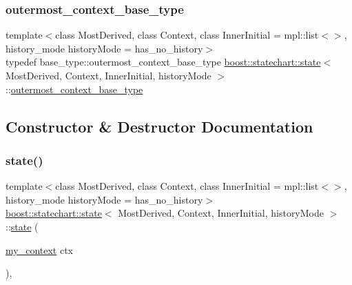 \mbox{\label{classboost_1_1statechart_1_1state_a1ba302317e3eb4b10d0c8424eea5ea67}} 
\subsubsection{\texorpdfstring{outermost\+\_\+context\+\_\+base\+\_\+type}{outermost\_context\_base\_type}}
{\footnotesize\ttfamily template$<$class Most\+Derived, class Context, class Inner\+Initial = mpl\+::list$<$$>$, history\+\_\+mode history\+Mode = has\+\_\+no\+\_\+history$>$ \\
typedef base\+\_\+type\+::outermost\+\_\+context\+\_\+base\+\_\+type \mbox{\hyperlink{classboost_1_1statechart_1_1state}{boost\+::statechart\+::state}}$<$ Most\+Derived, Context, Inner\+Initial, history\+Mode $>$\+::\mbox{\hyperlink{classboost_1_1statechart_1_1simple__state_a50f21d7a7d6632eb34430e74cbad3197}{outermost\+\_\+context\+\_\+base\+\_\+type}}}



\subsection{Constructor \& Destructor Documentation}
\mbox{\label{classboost_1_1statechart_1_1state_a5ce1b234749386623e483ce94911db4a}} 
\subsubsection{\texorpdfstring{state()}{state()}}
{\footnotesize\ttfamily template$<$class Most\+Derived, class Context, class Inner\+Initial = mpl\+::list$<$$>$, history\+\_\+mode history\+Mode = has\+\_\+no\+\_\+history$>$ \\
\mbox{\hyperlink{classboost_1_1statechart_1_1state}{boost\+::statechart\+::state}}$<$ Most\+Derived, Context, Inner\+Initial, history\+Mode $>$\+::\mbox{\hyperlink{classboost_1_1statechart_1_1state}{state}} (\begin{DoxyParamCaption}\item[{\mbox{\hyperlink{structboost_1_1statechart_1_1state_1_1my__context}{my\+\_\+context}}}]{ctx }\end{DoxyParamCaption})\hspace{0.3cm}{\ttfamily [inline]}, {\ttfamily [protected]}}

